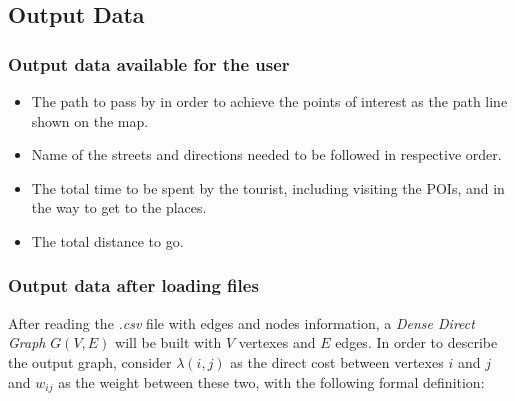 \documentclass{article}
\begin{document}
\subsection*{Output Data}
    \subsubsection*{Output data available for the user}
    \begin{itemize}
        \item The path to pass by in order to achieve the points of interest as the path line shown on the map.
        \item Name of the streets and directions needed to be followed in respective order.
        \item The total time to be spent by the tourist, including visiting the POIs, and in the way to get to the places.
        \item The total distance to go. 
    \end{itemize}
    
    \subsubsection*{Output data after loading files}
    After reading the \textit{.csv} file with edges and nodes information, a \textit{Dense Direct Graph} $G(V,E)$ will be built with $V$ vertexes and $E$ edges. In order to describe the output graph, consider $\lambda(i,j)$ as the direct cost between vertexes $i$ and $j$ and $w_{ij}$ as the weight between these two, with the following formal definition:
    
\end{document}
